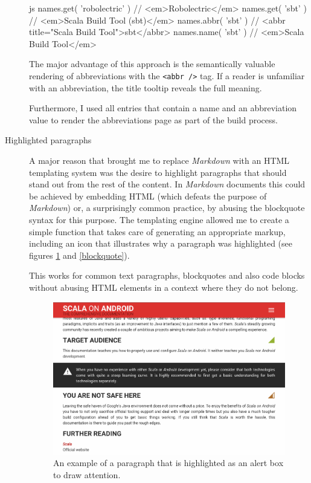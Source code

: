 \begin{description}
	\begin{code}{js}
names.get( 'robolectric' ) // <em>Robolectric</em>
names.get( 'sbt' ) // <em>Scala Build Tool (sbt)</em>
names.abbr( 'sbt' ) // <abbr title="Scala Build Tool">sbt</abbr>
names.name( 'sbt' ) // <em>Scala Build Tool</em>
	\end{code}

	The major advantage of this approach is the semantically valuable rendering of abbreviations with the \texttt{<abbr />} tag. If a reader is unfamiliar with an abbreviation, the title tooltip reveals the full meaning.

	Furthermore, I used all entries that contain a name and an abbreviation value to render the abbreviations page as part of the build process.

	\item[Highlighted paragraphs]\hfill

	A major reason that brought me to replace \textit{Markdown} with an \ac{HTML} templating system was the desire to highlight paragraphs that should stand out from the rest of the content. In \textit{Markdown} documents this could be achieved by embedding \ac{HTML} (which defeats the purpose of \textit{Markdown}) or, a surprisingly common practice, by abusing the blockquote syntax for this purpose. The templating engine allowed me to create a simple function that takes care of generating an appropriate markup, including an icon that illustrates why a paragraph was highlighted (see figures \ref{alert} and \ref{blockquote}).

	\begin{code}{html}
{%
	<p>Lorem Ipsum</p>
{%
	\end{code}

	This works for common text paragraphs, blockquotes and also code blocks without abusing \ac{HTML} elements in a context where they do not belong.

	\begin{figure}[H]
		\includegraphics[width=\textwidth]{asset/alert.png}
		\caption{An example of a paragraph that is highlighted as an alert box to draw attention.}
		\label{alert}
	\end{figure}


\end{description}
